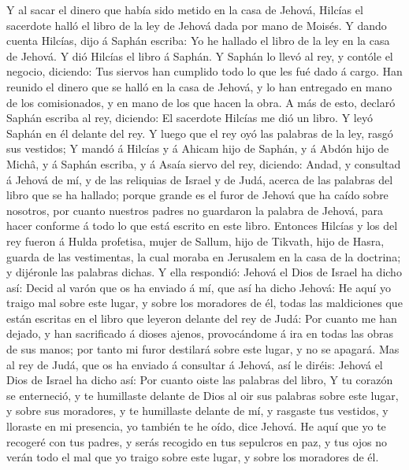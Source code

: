  Y al sacar el dinero que había sido metido en la casa de
Jehová, Hilcías el sacerdote halló el libro de la ley de Jehová dada por
mano de Moisés.  Y dando cuenta Hilcías, dijo á Saphán
escriba: Yo he hallado el libro de la ley en la casa de Jehová. Y dió
Hilcías el libro á Saphán.  Y Saphán lo llevó al rey, y
contóle el negocio, diciendo: Tus siervos han cumplido todo lo que les
fué dado á cargo.  Han reunido el dinero que se halló en
la casa de Jehová, y lo han entregado en mano de los comisionados, y en
mano de los que hacen la obra.  A más de esto, declaró
Saphán escriba al rey, diciendo: El sacerdote Hilcías me dió un libro. Y
leyó Saphán en él delante del rey.  Y luego que el rey
oyó las palabras de la ley, rasgó sus vestidos;  Y mandó
á Hilcías y á Ahicam hijo de Saphán, y á Abdón hijo de Michâ, y á Saphán
escriba, y á Asaía siervo del rey, diciendo:  Andad, y
consultad á Jehová de mí, y de las reliquias de Israel y de Judá, acerca
de las palabras del libro que se ha hallado; porque grande es el furor
de Jehová que ha caído sobre nosotros, por cuanto nuestros padres no
guardaron la palabra de Jehová, para hacer conforme á todo lo que está
escrito en este libro.  Entonces Hilcías y los del rey
fueron á Hulda profetisa, mujer de Sallum, hijo de Tikvath, hijo de
Hasra, guarda de las vestimentas, la cual moraba en Jerusalem en la casa
de la doctrina; y dijéronle las palabras dichas.  Y ella
respondió: Jehová el Dios de Israel ha dicho así: Decid al varón que os
ha enviado á mí, que así ha dicho Jehová:  He aquí yo
traigo mal sobre este lugar, y sobre los moradores de él, todas las
maldiciones que están escritas en el libro que leyeron delante del rey
de Judá:  Por cuanto me han dejado, y han sacrificado á
dioses ajenos, provocándome á ira en todas las obras de sus manos; por
tanto mi furor destilará sobre este lugar, y no se apagará.
 Mas al rey de Judá, que os ha enviado á consultar á
Jehová, así le diréis: Jehová el Dios de Israel ha dicho así: Por cuanto
oiste las palabras del libro,  Y tu corazón se
enterneció, y te humillaste delante de Dios al oir sus palabras sobre
este lugar, y sobre sus moradores, y te humillaste delante de mí, y
rasgaste tus vestidos, y lloraste en mi presencia, yo también te he
oído, dice Jehová.  He aquí que yo te recogeré con tus
padres, y serás recogido en tus sepulcros en paz, y tus ojos no verán
todo el mal que yo traigo sobre este lugar, y sobre los moradores de él.
